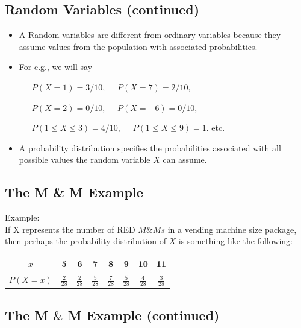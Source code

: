 \documentclass[
  letterpaper,
  DIV=11,
  numbers=noendperiod]{scrartcl}
\begin{document}
\subsection{Random Variables
(continued)}\label{random-variables-continued}

\begin{itemize}
\item
  A {Random variables} are different from ordinary variables because
  they assume values from the population with associated probabilities.
\item
  For e.g., we will say\\
  \strut ~~~\(P(X=1)=3/10\),~~~\(P(X=7)=2/10\),\\
  \strut ~~~\(P(X=2)=0/10\),~~~\(P(X=-6)=0/10\),\\
  \strut ~~~\(P(1 \leq X \leq 3)=4/10\),~~~\(P(1 \leq X \leq 9)=1\).
  etc.
\item
  A {probability distribution} specifies the probabilities associated
  with all possible values the random variable \(X\) can assume.\\
\end{itemize}

\subsection{The M \& M Example}\label{the-m-m-example}

{Example}:\\
If X represents the number of RED \(M\&Ms\) in a vending machine size
package, then perhaps {the probability distribution of \(X\)} is
something like the following:\\

\begin{longtable}[]{@{}cccccccc@{}}
\toprule\noalign{}
\(x\) & 5 & 6 & 7 & 8 & 9 & 10 & 11 \\
\midrule\noalign{}
\endhead
\bottomrule\noalign{}
\endlastfoot
\(P(X=x)\) & \(\frac{2}{28}\) & \(\frac{2}{28}\) & \(\frac{5}{28}\) &
\(\frac{7}{28}\) & \(\frac{5}{28}\) & \(\frac{4}{28}\) &
\(\frac{3}{28}\) \\
\end{longtable}

\subsection{\texorpdfstring{The M \(\&\) M Example
(continued)}{The M \textbackslash\& M Example (continued)}}\label{the-m-m-example-continued}
\end{document}
